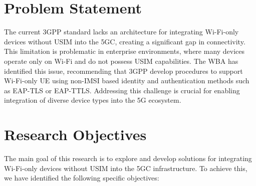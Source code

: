 \section{Problem Statement}

The current \ac{3GPP} standard lacks an architecture for integrating Wi-Fi-only devices without \ac{USIM} into the \acl{5GC}, creating a significant gap in connectivity. This limitation is problematic in enterprise environments, where many devices operate only on Wi-Fi and do not possess \ac{USIM} capabilities. The \ac{WBA} has identified this issue, recommending that \ac{3GPP} develop procedures to support Wi-Fi-only \ac{UE} using non-\acs{IMSI} based identity and authentication methods such as \ac{EAP-TLS} or \ac{EAP-TTLS}. Addressing this challenge is crucial for enabling integration of diverse device types into the \ac{5G} ecosystem.

\section{Research Objectives}

The main goal of this research is to explore and develop solutions for integrating Wi-Fi-only devices without \ac{USIM} into the \ac{5GC} infrastructure. To achieve this, we have identified the following specific objectives:

